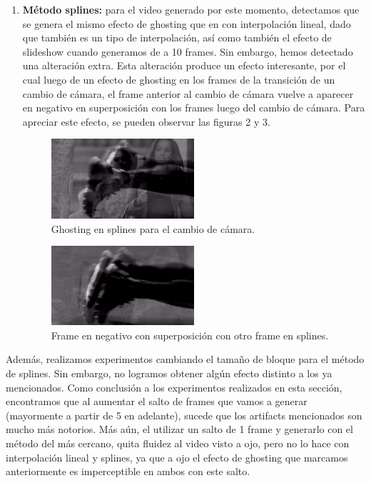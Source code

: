\begin{enumerate}
\item \textbf{M\'etodo splines:} para el video generado por este momento, detectamos que se genera el mismo efecto de ghosting que en con interpolaci\'on lineal, dado que tambi\'en es un tipo de interpolaci\'on, as\'i como tambi\'en el efecto de slideshow cuando generamos de a 10 frames. Sin embargo, hemos detectado una alteraci\'on extra. Esta alteraci\'on produce un efecto interesante, por el cual luego de un efecto de ghosting en los frames de la transici\'on de un cambio de c\'amara, el frame anterior al cambio de c\'amara vuelve a aparecer en negativo en superposici\'on con los frames luego del cambio de c\'amara. Para apreciar este efecto, se pueden observar las figuras 2 y 3.

\begin{figure}[H]
  \centering
    \includegraphics[width=0.5\textwidth]{img/ghosting_splines_1.png}
  	\caption{Ghosting en splines para el cambio de c\'amara.}
\end{figure}

\begin{figure}[H]
  \centering
    \includegraphics[width=0.5\textwidth]{img/ghosting_negative.png}
  	\caption{Frame en negativo con superposici\'on con otro frame en splines.}
\end{figure}

\end{enumerate}

Adem\'as, realizamos experimentos cambiando el tama\~no de bloque para el m\'etodo de splines. Sin embargo, no logramos obtener alg\'un efecto distinto a los ya mencionados. Como conclusi\'on a los experimentos realizados en esta secci\'on, encontramos que al aumentar el salto de frames que vamos a generar (mayormente a partir de 5 en adelante), sucede que los artifacts mencionados son mucho m\'as notorios. M\'as a\'un, el utilizar un salto de 1 frame y generarlo con el m\'etodo del m\'as cercano, quita fluidez al video visto a ojo, pero no lo hace con interpolaci\'on lineal y splines, ya que a ojo el efecto de ghosting que marcamos anteriormente es imperceptible en ambos con este salto.
